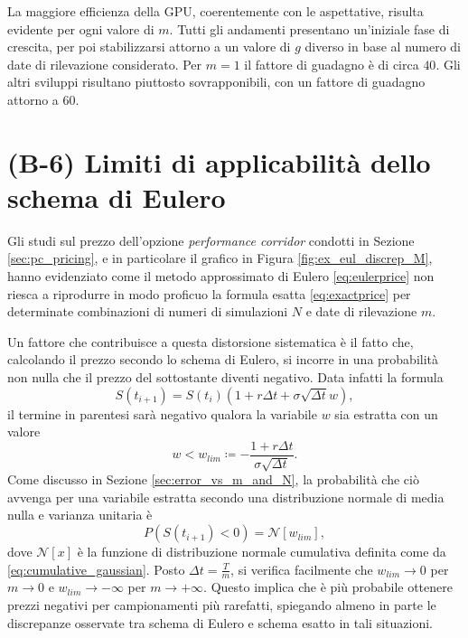 La maggiore efficienza della GPU, coerentemente con le aspettative, risulta evidente per ogni valore di $m$. Tutti gli andamenti presentano un'iniziale fase di crescita, per poi stabilizzarsi attorno a un valore di $g$ diverso in base al numero di date di rilevazione considerato. Per $m=1$ il fattore di guadagno è di circa $40$. Gli altri sviluppi risultano piuttosto sovrapponibili, con un fattore di guadagno attorno a $60$.

\section{(B-6) Limiti di applicabilità dello schema di Eulero} \label{sec:limits}

Gli studi sul prezzo dell'opzione \textit{performance corridor} condotti in Sezione \ref{sec:pc_pricing}, e in particolare il grafico in Figura \ref{fig:ex_eul_discrep_M}, hanno evidenziato come il metodo approssimato di Eulero \eqref{eq:eulerprice} non riesca a riprodurre in modo proficuo la formula esatta \eqref{eq:exactprice} per determinate combinazioni di numeri di simulazioni $N$ e date di rilevazione $m$.

Un fattore che contribuisce a questa distorsione sistematica è il fatto che, calcolando il prezzo secondo lo schema di Eulero, si incorre in una probabilità non nulla che il prezzo del sottostante diventi negativo. Data infatti la formula
\begin{equation}
    S(t_{i+1}) = S(t_i) \left(1 + r \Delta t + \sigma \sqrt{\Delta t} w\right),
    \label{eulerprice_repeat}
\end{equation}
il termine in parentesi sarà negativo qualora la variabile $w$ sia estratta con un valore
\begin{equation}
    w < w_{lim} \coloneqq - \frac{1+r \Delta t}{\sigma \sqrt{\Delta t}}.
    \label{eq:wcondition_withsigma}
\end{equation}
Come discusso in Sezione \ref{sec:error_vs_m_and_N}, la probabilità che ciò avvenga per una variabile estratta secondo una distribuzione normale di media nulla e varianza unitaria è
\begin{equation}
    P\left(S(t_{i+1})<0\right) = \mathcal{N}\left[w_{lim} \right],
    \label{eq:probability_negativeprice}
\end{equation}
dove $\mathcal{N}[x]$ è la funzione di distribuzione normale cumulativa definita come da \eqref{eq:cumulative_gaussian}. Posto $\Delta t = \frac{T}{m}$, si verifica facilmente che $w_{lim} \rightarrow 0$ per $m \rightarrow 0$ e $w_{lim} \rightarrow -\infty$ per $m \rightarrow +\infty$. Questo implica che è più probabile ottenere prezzi negativi per campionamenti più rarefatti, spiegando almeno in parte le discrepanze osservate tra schema di Eulero e schema esatto in tali situazioni.

